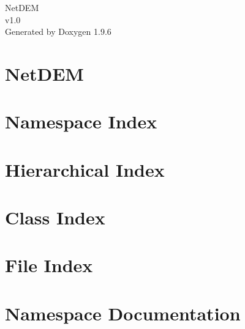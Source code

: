 \documentclass[twoside]{book}
\newcommand{\+}{\discretionary{\mbox{\scriptsize$\hookleftarrow$}}{}{}}
\newcommand{\clearemptydoublepage}{%
    \newpage{\pagestyle{empty}\cleardoublepage}%
  }
\begin{document}
  \raggedbottom
    \hypersetup{pageanchor=false,
                bookmarksnumbered=true,
                pdfencoding=unicode
               }
  \begin{titlepage}
  \vspace*{7cm}
  \begin{center}%
  {\Large Net\+DEM}\\
  [1ex]\large v1.\+0 \\
  \vspace*{1cm}
  {\large Generated by Doxygen 1.9.6}\\
  \end{center}
  \end{titlepage}
  \clearemptydoublepage
  \tableofcontents
  \clearemptydoublepage
  \hypersetup{pageanchor=true}
\chapter{Net\+DEM}
\label{index}\hypertarget{index}{}
\chapter{Namespace Index}

\chapter{Hierarchical Index}

\chapter{Class Index}

\chapter{File Index}

\chapter{Namespace Documentation}


\end{document}
